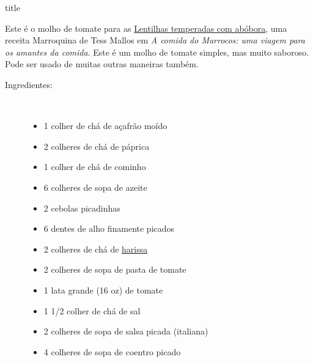 \documentclass [11pt, papel de carta] {article}
\begin{document}
 {title}

Este é o molho de tomate para as \href {SpicedLentilsWithPumpkin.html} {Lentilhas temperadas com abóbora}, uma receita Marroquina de Tess Mallos em {\it A comida do Marrocos: uma viagem para os amantes da comida}. Este é um molho de tomate simples, mas muito saboroso. Pode ser usado de muitas outras maneiras também.

\begin {description}

\item [Ingredientes:] \ \\
\begin {itemize}
\item 1 colher de chá de açafrão moído
\item 2 colheres de chá de páprica
\item 1 colher de chá de cominho
\item 6 colheres de sopa de azeite
\item 2 cebolas picadinhas
\item 6 dentes de alho finamente picados
\item 2 colheres de chá de \href{Harissa.html}{harissa}
\item 2 colheres de sopa de pasta de tomate
\item 1 lata grande (16 oz) de tomate
\item 1 1/2 colher de chá de sal
\item 2 colheres de sopa de salsa picada (italiana)
\item 4 colheres de sopa de coentro picado
\end {itemize}



\end{description}
\end{document}
